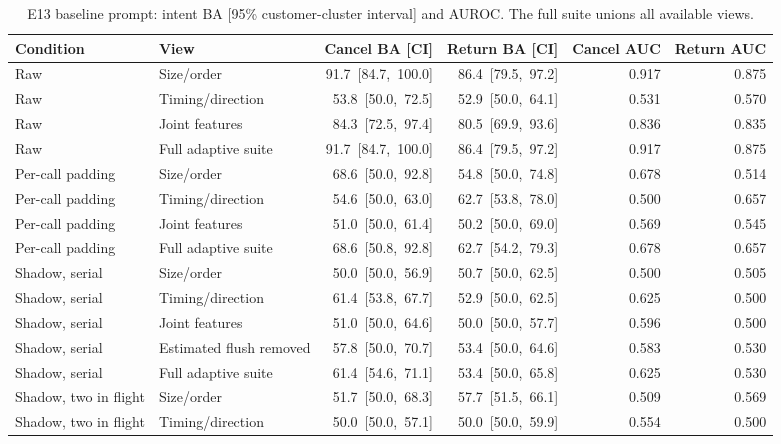 \begin{table}[htbp]\centering\footnotesize
\caption{E13 baseline prompt: intent BA [95\% customer-cluster interval] and AUROC. The full suite unions all available views.}
\begin{tabular}{llrrrr}\toprule
Condition & View & Cancel BA [CI] & Return BA [CI] & Cancel AUC & Return AUC\\\midrule
Raw & Size/order & \mbox{91.7 [84.7, 100.0]} & \mbox{86.4 [79.5, 97.2]} & 0.917 & 0.875 \\
Raw & Timing/direction & \mbox{53.8 [50.0, 72.5]} & \mbox{52.9 [50.0, 64.1]} & 0.531 & 0.570 \\
Raw & Joint features & \mbox{84.3 [72.5, 97.4]} & \mbox{80.5 [69.9, 93.6]} & 0.836 & 0.835 \\
Raw & Full adaptive suite & \mbox{91.7 [84.7, 100.0]} & \mbox{86.4 [79.5, 97.2]} & 0.917 & 0.875 \\
\addlinespace[2pt]
Per-call padding & Size/order & \mbox{68.6 [50.0, 92.8]} & \mbox{54.8 [50.0, 74.8]} & 0.678 & 0.514 \\
Per-call padding & Timing/direction & \mbox{54.6 [50.0, 63.0]} & \mbox{62.7 [53.8, 78.0]} & 0.500 & 0.657 \\
Per-call padding & Joint features & \mbox{51.0 [50.0, 61.4]} & \mbox{50.2 [50.0, 69.0]} & 0.569 & 0.545 \\
Per-call padding & Full adaptive suite & \mbox{68.6 [50.8, 92.8]} & \mbox{62.7 [54.2, 79.3]} & 0.678 & 0.657 \\
\addlinespace[2pt]
Shadow, serial & Size/order & \mbox{50.0 [50.0, 56.9]} & \mbox{50.7 [50.0, 62.5]} & 0.500 & 0.505 \\
Shadow, serial & Timing/direction & \mbox{61.4 [53.8, 67.7]} & \mbox{52.9 [50.0, 62.5]} & 0.625 & 0.500 \\
Shadow, serial & Joint features & \mbox{51.0 [50.0, 64.6]} & \mbox{50.0 [50.0, 57.7]} & 0.596 & 0.500 \\
Shadow, serial & Estimated flush removed & \mbox{57.8 [50.0, 70.7]} & \mbox{53.4 [50.0, 64.6]} & 0.583 & 0.530 \\
Shadow, serial & Full adaptive suite & \mbox{61.4 [54.6, 71.1]} & \mbox{53.4 [50.0, 65.8]} & 0.625 & 0.530 \\
\addlinespace[2pt]
Shadow, two in flight & Size/order & \mbox{51.7 [50.0, 68.3]} & \mbox{57.7 [51.5, 66.1]} & 0.509 & 0.569 \\
Shadow, two in flight & Timing/direction & \mbox{50.0 [50.0, 57.1]} & \mbox{50.0 [50.0, 59.9]} & 0.554 & 0.500 \\

\end{tabular}
\end{table}
